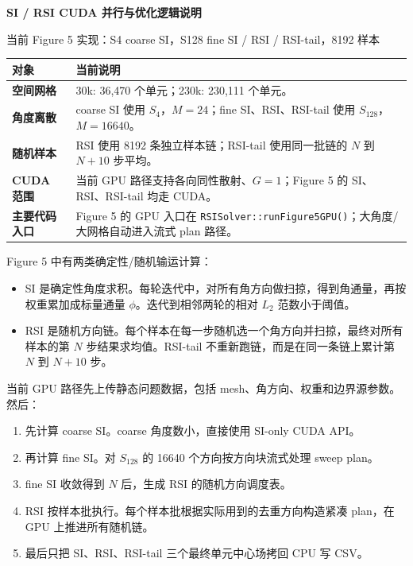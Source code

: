 \documentclass[10pt]{article}
\newcommand{\sect}[1]{\vspace{3mm}{\sffamily\Large\bfseries\color{titleblue} #1}\par\vspace{1mm}{\color{titleblue}\rule{\linewidth}{0.45pt}}\vspace{1mm}}
\newcommand{\code}[1]{\texttt{#1}}
\begin{document}
{\sffamily\bfseries\fontsize{24}{28}\selectfont\color{titleblue} SI / RSI CUDA 并行与优化逻辑说明}\par
\vspace{2mm}
{\sffamily\large 当前 Figure 5 实现：S4 coarse SI，S128 fine SI / RSI / RSI-tail，8192 样本}\par
\vspace{5mm}

\begin{tabularx}{\linewidth}{>{\bfseries}l X}
\toprule
对象 & 当前说明\\
\midrule
空间网格 & 30k: 36,470 个单元；230k: 230,111 个单元。\\
角度离散 & coarse SI 使用 $S_4$，$M=24$；fine SI、RSI、RSI-tail 使用 $S_{128}$，$M=16640$。\\
随机样本 & RSI 使用 8192 条独立样本链；RSI-tail 使用同一批链的 $N$ 到 $N+10$ 步平均。\\
CUDA 范围 & 当前 GPU 路径支持各向同性散射、$G=1$；Figure 5 的 SI、RSI、RSI-tail 均走 CUDA。\\
主要代码入口 & Figure 5 的 GPU 入口在 \code{RSISolver::runFigure5GPU()}；大角度/大网格自动进入流式 plan 路径。\\
\bottomrule
\end{tabularx}

\sect{1. 总体计算流程}

Figure 5 中有两类确定性/随机输运计算：

\begin{itemize}
\item SI 是确定性角度求积。每轮迭代中，对所有角方向做扫掠，得到角通量，再按权重累加成标量通量 $\phi$。迭代到相邻两轮的相对 $L_2$ 范数小于阈值。
\item RSI 是随机方向链。每个样本在每一步随机选一个角方向并扫掠，最终对所有样本的第 $N$ 步结果求均值。RSI-tail 不重新跑链，而是在同一条链上累计第 $N$ 到 $N+10$ 步。
\end{itemize}

当前 GPU 路径先上传静态问题数据，包括 mesh、角方向、权重和边界源参数。然后：

\begin{enumerate}
\item 先计算 coarse SI。coarse 角度数小，直接使用 SI-only CUDA API。
\item 再计算 fine SI。对 $S_{128}$ 的 16640 个方向按方向块流式处理 sweep plan。
\item fine SI 收敛得到 $N$ 后，生成 RSI 的随机方向调度表。
\item RSI 按样本批执行。每个样本批根据实际用到的去重方向构造紧凑 plan，在 GPU 上推进所有随机链。
\item 最后只把 SI、RSI、RSI-tail 三个最终单元中心场拷回 CPU 写 CSV。
\end{enumerate}
\end{document}
